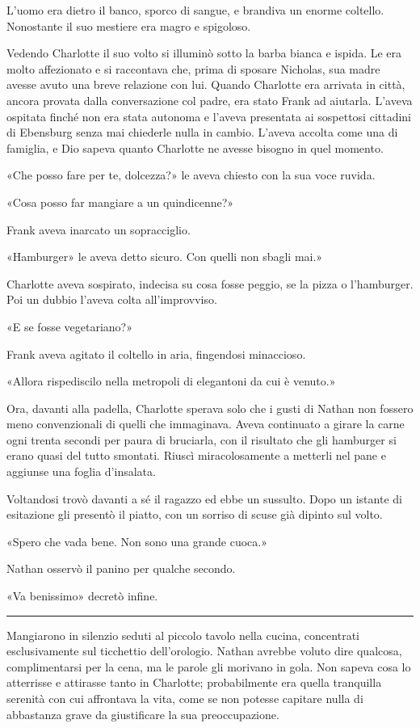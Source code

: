 \documentclass[a4paper,oneside,11pt]{memoir}
\begin{document}
L'uomo era dietro il banco, sporco di sangue, e brandiva un enorme coltello.
Nonostante il suo mestiere era magro e spigoloso.

Vedendo Charlotte il suo volto si illuminò sotto la barba bianca e ispida. Le
era molto affezionato e si raccontava che, prima di sposare Nicholas, sua madre
avesse avuto una breve relazione con lui. Quando Charlotte era arrivata in
città, ancora provata dalla conversazione col padre, era stato Frank ad
aiutarla. L'aveva ospitata finché non era stata autonoma e l'aveva presentata ai
sospettosi cittadini di Ebensburg senza mai chiederle nulla in cambio. L'aveva
accolta come una di famiglia, e Dio sapeva quanto Charlotte ne avesse bisogno in
quel momento.

«Che posso fare per te, dolcezza?» le aveva chiesto con la sua voce ruvida.

«Cosa posso far mangiare a un quindicenne?»

Frank aveva inarcato un sopracciglio.

«Hamburger» le aveva detto sicuro. Con quelli non sbagli mai.»

Charlotte aveva sospirato, indecisa su cosa fosse peggio, se la pizza o
l'hamburger. Poi un dubbio l'aveva colta all'improvviso.

«E se fosse vegetariano?»

Frank aveva agitato il coltello in aria, fingendosi minaccioso.

«Allora rispediscilo nella metropoli di elegantoni da cui è venuto.»

Ora, davanti alla padella, Charlotte sperava solo che i gusti di Nathan non
fossero meno convenzionali di quelli che immaginava. Aveva continuato a girare
la carne ogni trenta secondi per paura di bruciarla, con il risultato che gli
hamburger si erano quasi del tutto smontati. Riuscì miracolosamente a metterli
nel pane e aggiunse una foglia d'insalata.

Voltandosi trovò davanti a sé il ragazzo ed ebbe un sussulto. Dopo un istante di
esitazione gli presentò il piatto, con un sorriso di scuse già dipinto sul
volto.

«Spero che vada bene. Non sono una grande cuoca.»

Nathan osservò il panino per qualche secondo.

«Va benissimo» decretò infine.

\plainbreak{1}

Mangiarono in silenzio seduti al piccolo tavolo nella cucina, concentrati
esclusivamente sul ticchettio dell'orologio. Nathan avrebbe voluto dire
qualcosa, complimentarsi per la cena, ma le parole gli morivano in gola. Non
sapeva cosa lo atterrisse e attirasse tanto in Charlotte; probabilmente era
quella tranquilla serenità con cui affrontava la vita, come se non potesse
capitare nulla di abbastanza grave da giustificare la sua preoccupazione.
\end{document}
